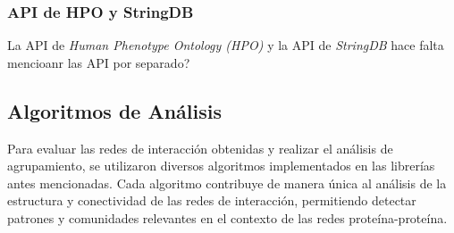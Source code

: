 \subsubsection{API de HPO y StringDB}
La API de \textit{Human Phenotype Ontology (HPO)} y la API de \textit{StringDB} hace falta mencioanr las API por separado?

\subsection{Algoritmos de Análisis}

Para evaluar las redes de interacción obtenidas y realizar el análisis de agrupamiento, se utilizaron diversos algoritmos implementados en las librerías antes mencionadas. Cada algoritmo contribuye de manera única al análisis de la estructura y conectividad de las redes de interacción, permitiendo detectar patrones y comunidades relevantes en el contexto de las redes proteína-proteína.
\\

